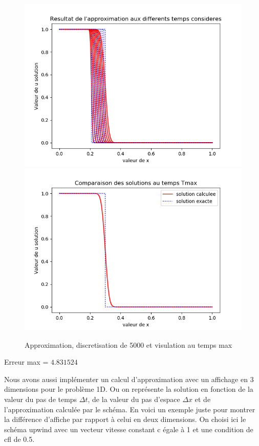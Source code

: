 \documentclass[12pt]{article}
\begin{document}
 \begin{figure}[H]
	\centering
	\includegraphics[scale=0.40]{1D_c1_5000_s5_i3.png}
	\includegraphics[scale=0.40]{Temp_max_c1_5000_s5_init3.png}
	\caption{Approximation, discretisation de 5000 et visulation au temps max}
	\label{1D}
	\end{figure}
Erreur max = $4.831524$

Nous avons aussi implémenter un calcul d'approximation avec un affichage en 3 dimensions pour le problème 1D. Ou on représente la solution en fonction de la valeur du pas de temps $\Delta t$, de la valeur du pas d'espace $\Delta x$ et de l'approximation calculée par le schéma. En voici un exemple juste pour montrer la différence d'affiche par rapport à celui en deux dimensions.
On choisi ici le schéma upwind avec un vecteur vitesse constant c égale à 1 et une condition de cfl de 0.5.  
\end{document}
